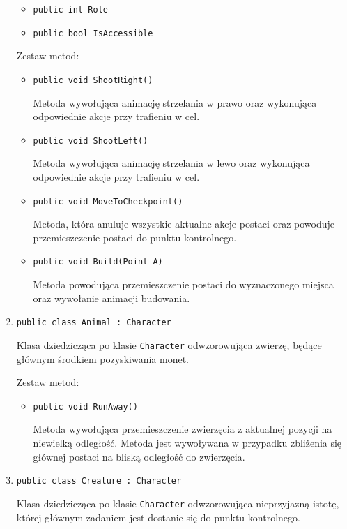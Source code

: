 \documentclass[12pt, a4paper]{article}
\begin{document}
\begin{enumerate}
\begin{itemize}
\item \texttt{public int Role}
\item \texttt{public bool IsAccessible}
\end{itemize}

Zestaw metod$\colon$

\begin{itemize}
\item \texttt{public void ShootRight()}

Metoda wywołująca animację strzelania w prawo oraz wykonująca odpowiednie 
akcje przy trafieniu w cel.

\item \texttt{public void ShootLeft()}

Metoda wywołująca animację strzelania w lewo oraz wykonująca odpowiednie 
akcje przy trafieniu w cel.

\item \texttt{public void MoveToCheckpoint()}

Metoda, która anuluje wszystkie aktualne akcje postaci oraz powoduje 
przemieszczenie postaci do punktu kontrolnego.

\item \texttt{public void Build(Point A)}

Metoda powodująca przemieszczenie postaci do wyznaczonego miejsca oraz 
wywołanie animacji budowania. 

\end{itemize}

\item \texttt{public class Animal : Character}

Klasa dziedzicząca po klasie \texttt{Character} odwzorowująca zwierzę, będące
głównym środkiem pozyskiwania monet.

Zestaw metod$\colon$

\begin{itemize}
\item \texttt{public void RunAway()}

Metoda wywołująca przemieszczenie zwierzęcia z aktualnej pozycji na niewielką 
odległość. Metoda jest wywoływana w przypadku zbliżenia się głównej postaci 
na bliską odległość do zwierzęcia.

\end{itemize}

\item \texttt{public class Creature : Character}

Klasa dziedzicząca po klasie \texttt{Character} odwzorowująca nieprzyjazną
istotę, której głównym zadaniem jest dostanie się do punktu kontrolnego.


\end{enumerate}
\end{document}
